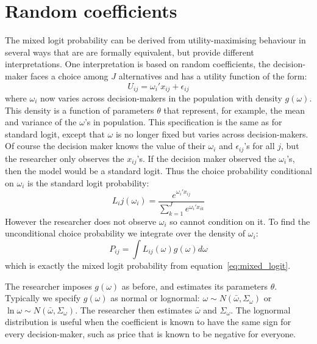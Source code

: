 \documentclass[DIV=14,titlepage=false]{scrreprt}
\begin{document}
\section{Random coefficients}
The mixed logit probability can be derived from utility-maximising behaviour in several ways that are are formally equivalent, but provide different interpretations. One interpretation is based on random coefficients, the decision-maker faces a choice among $J$ alternatives and has a utility function of the form:
\[
    U_{ij} = \omega_i ' x_{ij} + \epsilon_{ij}
\]
where $\omega_i$ now varies across decision-makers in the population with density $g(\omega)$. This density is a function of parameters $\theta$ that represent, for example, the mean and variance of the $\omega$'s in population. This specification is the same as for standard logit, except that $\omega$ is no longer fixed but varies across decision-makers. Of course the decision maker knows the value of their $\omega_i$ and $\epsilon_{ij}$'s for all $j$, but the researcher only observes the $x_{ij}$'s. If the decision maker observed the $\omega_i$'s, then the model would be a standard logit. Thus the choice probability conditional on $\omega_i$ is the standard logit probability:
\[
    L_ij(\omega_i) = \frac{e^{\omega_i'x_{ij}}}{\sum_{k=1}^{J}e^{\omega_i'x_{ik}}}
\]
However the researcher does not observe $\omega_i$ so cannot condition on it. To find the unconditional choice probability we integrate over the density of $\omega_i$:
\[
    P_{ij} = \int L_{ij}(\omega)g(\omega)d\omega
\]
which is exactly the mixed logit probability from equation~\ref{eq:mixed_logit}.
\begin{note}
    The researcher imposes $g(\omega)$ as before, and estimates its parameters $\theta$. Typically we specify $g(\omega)$ as normal or lognormal: $\omega \sim N(\bar \omega, \Sigma_\omega)$ or $\ln \omega \sim N(\bar \omega, \Sigma_\omega)$. The researcher then estimates $\bar \omega$ and $\Sigma_\omega$. The lognormal distribution is useful when the coefficient is known to have the same sign for every decision-maker, such as price that is known to be negative for everyone.
\end{note}
\end{document}

